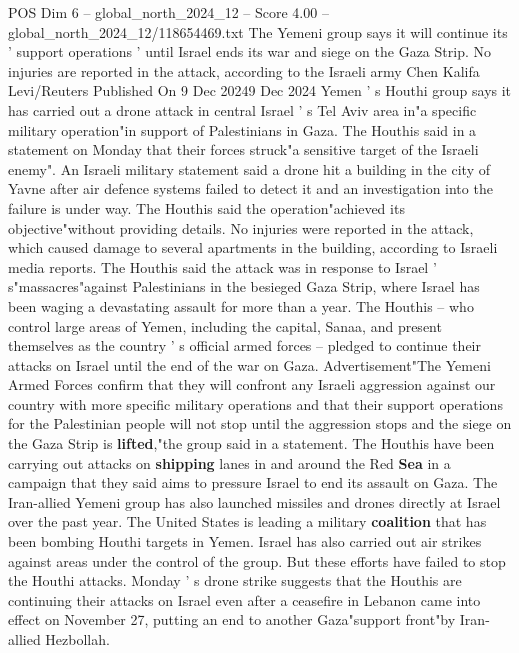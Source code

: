 \begin{textsample}{POS Dim 6 – global\_north\_2024\_12 – Score 4.00 – global\_north\_2024\_12/118654469.txt}  \label{ex:f6_pos_269}
The Yemeni group says it will continue its ' support operations ' until Israel ends its war and siege on the Gaza Strip.
No injuries are reported in the attack, according to the Israeli army Chen Kalifa Levi/Reuters Published On 9 Dec 20249 Dec 2024 Yemen ' s Houthi group says it has carried out a drone attack in central Israel ' s Tel Aviv area in"a specific military operation"in support of Palestinians in Gaza.
The Houthis said in a statement on Monday that their forces struck"a sensitive target of the Israeli enemy".
An Israeli military statement said a drone hit a building in the city of Yavne after air defence systems failed to detect it and an investigation into the failure is under way.
The Houthis said the operation"achieved its objective"without providing details.
No injuries were reported in the attack, which caused damage to several apartments in the building, according to Israeli media reports.
The Houthis said the attack was in response to Israel ' s"massacres"against Palestinians in the besieged Gaza Strip, where Israel has been waging a devastating assault for more than a year.
The Houthis -- who control large areas of Yemen, including the capital, Sanaa, and present themselves as the country ' s official armed forces -- pledged to continue their attacks on Israel until the end of the war on Gaza.
Advertisement"The Yemeni Armed Forces confirm that they will confront any Israeli aggression against our country with more specific military operations and that their support operations for the Palestinian people will not stop until the aggression stops and the siege on the Gaza Strip is \textbf{lifted},"the group said in a statement.
The Houthis have been carrying out attacks on \textbf{shipping} lanes in and around the Red \textbf{Sea} in a campaign that they said aims to pressure Israel to end its assault on Gaza.
The Iran-allied Yemeni group has also launched missiles and drones directly at Israel over the past year.
The United States is leading a military \textbf{coalition} that has been bombing Houthi targets in Yemen.
Israel has also carried out air strikes against areas under the control of the group.
But these efforts have failed to stop the Houthi attacks.
Monday ' s drone strike suggests that the Houthis are continuing their attacks on Israel even after a ceasefire in Lebanon came into effect on November 27, putting an end to another Gaza"support front"by Iran-allied Hezbollah.

\end{textsample}
